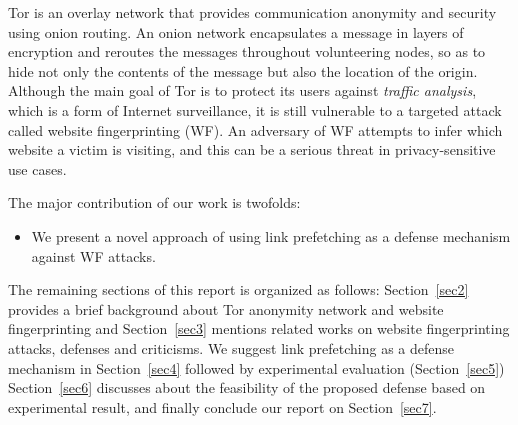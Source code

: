 
\iffalse
Anonymizing networks are privacy technologies that provide a mancinism to anonymize internet communications so as to protect users from network eavesdroppers.
Although such systems are able to hide the communication (including both routing information and content), an attacker is still able to obtain different information by analyzing the network traffic.
Network analysis can provide very rich information about message length, timing, and frequency by which an attacker can easily identify the communicating parties, and therefore bypass an anonymizing system.
This problem is known as Website Fingerprinting (WF) attack, where an adversary attempts to recognize the encrypted traffic patterns of specific web pages without using any other information \cite{juarez14, murdoch2005low}.
\fi

Tor is an overlay network that provides communication anonymity and security using onion routing.
An onion network encapsulates a message in layers of encryption and reroutes the messages throughout volunteering nodes, so as to hide not only the contents of the message but also the location of the origin.
Although the main goal of Tor is to protect its users against {\it traffic analysis}, which is a form of Internet surveillance, it is still vulnerable to a targeted attack called website fingerprinting (WF).
An adversary of WF attempts to infer which website a victim is visiting, and this can be a serious threat in privacy-sensitive use cases.




The major contribution of our work is twofolds:
\begin{itemize}
\item
We present a novel approach of using link prefetching as a defense mechanism against WF attacks.
\end{itemize}

The remaining sections of this report is organized as follows: Section~\ref{sec2} provides a brief background about Tor anonymity network and website fingerprinting and Section~\ref{sec3} mentions related works on website fingerprinting attacks, defenses and criticisms.
We suggest link prefetching as a defense mechanism in Section~\ref{sec4} followed by experimental evaluation (Section~\ref{sec5})
Section~\ref{sec6} discusses about the feasibility of the proposed defense based on experimental result, and finally conclude our report on Section~\ref{sec7}.

